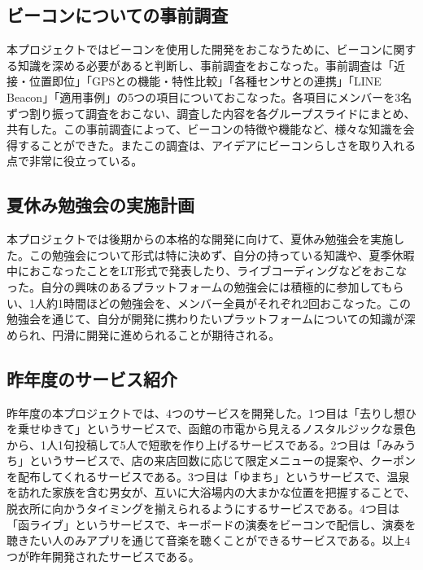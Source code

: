 
\subsection{ビーコンについての事前調査}
本プロジェクトではビーコンを使用した開発をおこなうために、ビーコンに関する知識を深める必要があると判断し、事前調査をおこなった。事前調査は「近接・位置即位」「GPSとの機能・特性比較」「各種センサとの連携」「LINE Beacon」「適用事例」の5つの項目についておこなった。各項目にメンバーを3名ずつ割り振って調査をおこない、調査した内容を各グループスライドにまとめ、共有した。この事前調査によって、ビーコンの特徴や機能など、様々な知識を会得することができた。またこの調査は、アイデアにビーコンらしさを取り入れる点で非常に役立っている。

\subsection{夏休み勉強会の実施計画}
本プロジェクトでは後期からの本格的な開発に向けて、夏休み勉強会を実施した。この勉強会について形式は特に決めず、自分の持っている知識や、夏季休暇中におこなったことをLT形式で発表したり、ライブコーディングなどをおこなった。自分の興味のあるプラットフォームの勉強会には積極的に参加してもらい、1人約1時間ほどの勉強会を、メンバー全員がそれぞれ2回おこなった。この勉強会を通じて、自分が開発に携わりたいプラットフォームについての知識が深められ、円滑に開発に進められることが期待される。

\subsection{昨年度のサービス紹介}
昨年度の本プロジェクトでは、4つのサービスを開発した。1つ目は「去りし想ひを乗せゆきて」というサービスで、函館の市電から見えるノスタルジックな景色から、1人1句投稿して5人で短歌を作り上げるサービスである。2つ目は「みみうち」というサービスで、店の来店回数に応じて限定メニューの提案や、クーポンを配布してくれるサービスである。3つ目は「ゆまち」というサービスで、温泉を訪れた家族を含む男女が、互いに大浴場内の大まかな位置を把握することで、脱衣所に向かうタイミングを揃えられるようにするサービスである。4つ目は「函ライブ」というサービスで、キーボードの演奏をビーコンで配信し、演奏を聴きたい人のみアプリを通じて音楽を聴くことができるサービスである。以上4つが昨年開発されたサービスである。

